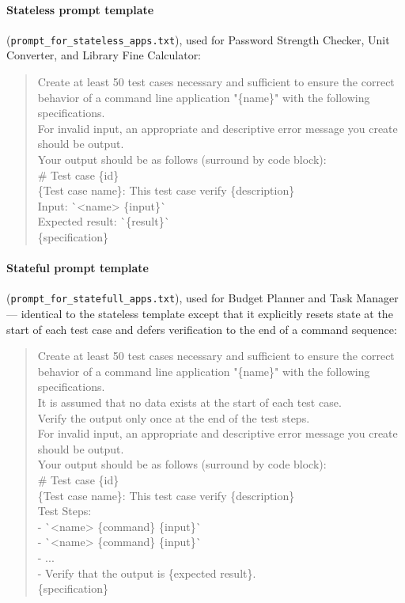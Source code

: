 \documentclass[12pt,a4paper]{article}
\begin{document}
\paragraph{Stateless prompt template} (\texttt{prompt\_for\_stateless\_apps.txt}), used for Password Strength Checker, Unit Converter, and Library Fine Calculator:
\begin{quote}
\small\ttfamily
Create at least 50 test cases necessary and sufficient to ensure the correct behavior of a command line application "\{name\}" with the following specifications.\\
For invalid input, an appropriate and descriptive error message you create should be output.\\[4pt]
Your output should be as follows (surround by code block):\\[4pt]
\# Test case \{id\}\\[2pt]
\{Test case name\}: This test case verify \{description\}\\
Input: \`{}<name> \{input\}\`{}\\
Expected result: \`{}\{result\}\`{}\\[4pt]
\{specification\}
\end{quote}

\paragraph{Stateful prompt template} (\texttt{prompt\_for\_statefull\_apps.txt}), used for Budget Planner and Task Manager --- identical to the stateless template except that it explicitly resets state at the start of each test case and defers verification to the end of a command sequence:
\begin{quote}
\small\ttfamily
Create at least 50 test cases necessary and sufficient to ensure the correct behavior of a command line application "\{name\}" with the following specifications.\\
It is assumed that no data exists at the start of each test case.\\
Verify the output only once at the end of the test steps.\\
For invalid input, an appropriate and descriptive error message you create should be output.\\[4pt]
Your output should be as follows (surround by code block):\\[4pt]
\# Test case \{id\}\\[2pt]
\{Test case name\}: This test case verify \{description\}\\
Test Steps:\\[2pt]
- \`{}<name> \{command\} \{input\}\`{}\\
- \`{}<name> \{command\} \{input\}\`{}\\
- ...\\
- Verify that the output is \{expected result\}.\\[4pt]
\{specification\}
\end{quote}
\end{document}
